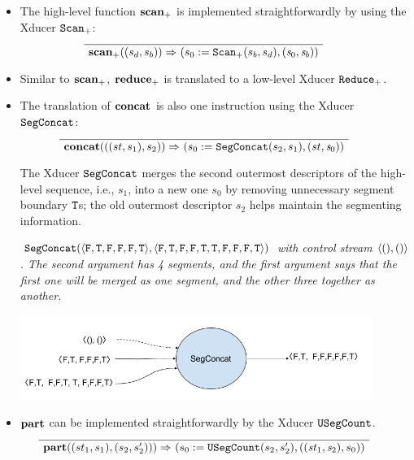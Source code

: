 \begin{itemize}
\item The high-level function $\mathbf{scan}_+$ is implemented straightforwardly by using the  Xducer $\mathtt{Scan}_{+}$:
	$$	\PT{
	\Axiom{\Transf{\*{scan}_+}{(s_d,s_b)}{}{}{\sfun{\sdef{s_0}{\genscan_{+}(s_b,s_d)}} {(\s_0,\s_b)}}}
}$$

\item Similar to $\mathbf{scan}_+$, $\mathbf{reduce}_+$  is translated to a low-level Xducer $\mathtt{Reduce}_{+}$.

\item The translation of $\mathbf{concat}$ is also one instruction using the Xducer $\mathtt{SegConcat}$:
$$	\PT{
	\Axiom{\Transf{\*{concat}}{((st,s_1),s_2)}{}{}{\sfun{\sdef{s_0}{\segconcat(s_2,s_1)}} {(st,\s_0)}}}
}$$


The Xducer $\mathtt{SegConcat}$ merges the second outermost descriptors of the high-level sequence, i.e., $s_1$, into a new one $s_0$ by removing unnecessary segment boundary $\mathtt{T}$s; the old outermost descriptor $s_2$ helps maintain the segmenting information.

\begin{example} \emph{$\segconcat(\<\F,\T,\F,\F,\F,\T\'>,\< \F,\T, \F,\F,\T,\T, \F,\F, \F,\T \'>)$ with control stream $\<(),()\'>$. The second argument has 4 segments, and the first argument says that the first one will be merged as one segment, and the other three together as another.}\\
	\begin{center}
		\includegraphics[width=0.9\textwidth]{fig/segconcat.png}
	\end{center}
\end{example}


\item $\mathbf{part}$ can be implemented straightforwardly by the Xducer $\mathtt{USegCount}$.
$$	\PT{
	\Axiom{\Transf{\*{part}}{(st_1,s_1),(s_2,s_2'))}{}{}{\sfun{\sdef{s_0}{\usegcount(s_2,s_2')}} {((\st_1,\s_2),s_0)}}}
}$$


\end{itemize}
